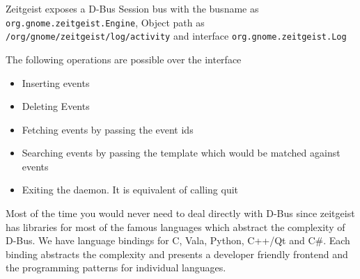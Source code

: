 Zeitgeist exposes a D-Bus Session bus with the busname as \texttt{org.gnome.zeitgeist.Engine}, 
Object path as \texttt{/org/gnome/zeitgeist/log/activity} and interface 
\texttt{org.gnome.zeitgeist.Log}

\linebreak
The following operations are possible over the interface

\begin{itemize}
\item Inserting events
\item Deleting Events
\item Fetching events by passing the event ids
\item Searching events by passing the template which would be matched against events
\item Exiting the daemon. It is equivalent of calling quit
\end{itemize}

Most of the time you would never need to deal directly with D-Bus since zeitgeist has 
libraries for most of the famous languages which abstract the complexity of D-Bus. We 
have language bindings for C, Vala, Python, C++/Qt and C\#. Each binding abstracts the 
complexity and presents a developer friendly frontend and the programming patterns 
for individual languages.
